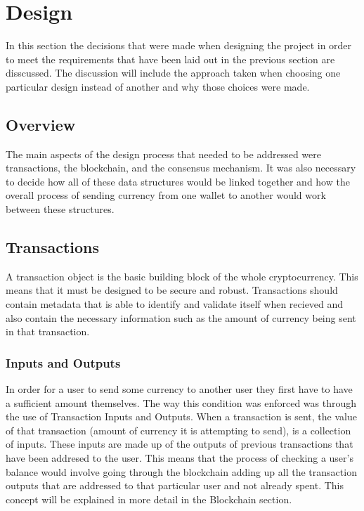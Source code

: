 \documentclass{l4proj}
\begin{document}
\chapter{Design}
In this section the decisions that were made when designing the project in order to meet the requirements
that have been laid out in the previous section are disscussed. The discussion will include the approach taken when
choosing one particular design instead of another and why those choices were made.

\section{Overview}
The main aspects of the design process that needed to be addressed were transactions, the blockchain, and
the consensus mechanism. It was also necessary to decide how all of these data structures would be linked together and
how the overall process of sending currency from one wallet to another would work between these structures.


\section{Transactions}
A transaction object is the basic building block of the whole cryptocurrency. This means that it must be designed 
to be secure and robust. Transactions should contain metadata that is able to identify and validate itself when
recieved and also contain the necessary information such as the amount of currency being sent in that transaction.

\subsection{Inputs and Outputs}
In order for a user to send some currency to another user they first have to have a sufficient amount themselves. The
way this condition was enforced was through the use of Transaction Inputs and Outputs. When a transaction is
sent, the value of that transaction (amount of currency it is attempting to send), is a collection of inputs. These inputs
are made up of the outputs of previous transactions that have been addresed to the user. This means that the process of
checking a user's balance would involve going through the blockchain adding up all the transaction outputs that
are addressed to that particular user and not already spent. This concept will be explained in more detail in the Blockchain section.
\end{document}
